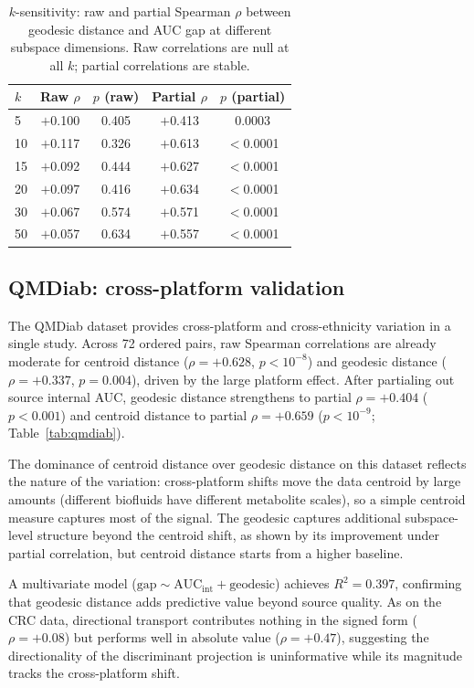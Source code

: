 \documentclass{article}
\begin{document}
\begin{table}[t]
\centering
\caption{$k$-sensitivity: raw and partial Spearman $\rho$ between geodesic distance and AUC gap at different subspace dimensions. Raw correlations are null at all $k$; partial correlations are stable.}
\label{tab:ksens}
\begin{tabular}{lcccc}
\toprule
$k$ & Raw $\rho$ & $p$ (raw) & Partial $\rho$ & $p$ (partial) \\
\midrule
5  & $+$0.100 & 0.405 & $+$0.413 & 0.0003 \\
10 & $+$0.117 & 0.326 & $+$0.613 & $<$0.0001 \\
15 & $+$0.092 & 0.444 & $+$0.627 & $<$0.0001 \\
20 & $+$0.097 & 0.416 & $+$0.634 & $<$0.0001 \\
30 & $+$0.067 & 0.574 & $+$0.571 & $<$0.0001 \\
50 & $+$0.057 & 0.634 & $+$0.557 & $<$0.0001 \\
\bottomrule
\end{tabular}
\end{table}


\subsection{QMDiab: cross-platform validation}
\label{sec:qmdiab}

The QMDiab dataset provides cross-platform and cross-ethnicity variation in a single study. Across 72 ordered pairs, raw Spearman correlations are already moderate for centroid distance ($\rho = +0.628$, $p < 10^{-8}$) and geodesic distance ($\rho = +0.337$, $p = 0.004$), driven by the large platform effect. After partialing out source internal AUC, geodesic distance strengthens to partial $\rho = +0.404$ ($p < 0.001$) and centroid distance to partial $\rho = +0.659$ ($p < 10^{-9}$; Table~\ref{tab:qmdiab}).

The dominance of centroid distance over geodesic distance on this dataset reflects the nature of the variation: cross-platform shifts move the data centroid by large amounts (different biofluids have different metabolite scales), so a simple centroid measure captures most of the signal. The geodesic captures additional subspace-level structure beyond the centroid shift, as shown by its improvement under partial correlation, but centroid distance starts from a higher baseline.

A multivariate model ($\text{gap} \sim \text{AUC}_{\mathrm{int}} + \text{geodesic}$) achieves $R^2 = 0.397$, confirming that geodesic distance adds predictive value beyond source quality. As on the CRC data, directional transport contributes nothing in the signed form ($\rho = +0.08$) but performs well in absolute value ($\rho = +0.47$), suggesting the directionality of the discriminant projection is uninformative while its magnitude tracks the cross-platform shift.
\end{document}
